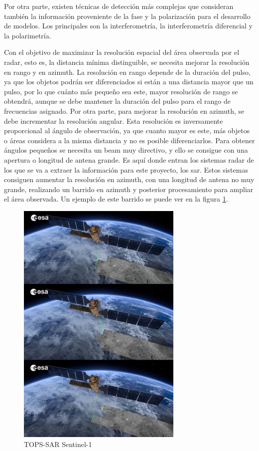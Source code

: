 \par Por otra parte, existen técnicas de detección más complejas que consideran también la información proveniente de la fase y la polarización para el desarrollo de modelos. Los principales son la interferometría, la interferometría diferencial y la polarimetría.
\\
\par Con el objetivo de maximizar la resolución espacial del área observada por el radar, esto es, la distancia mínima distinguible, se necesita mejorar la resolución en rango y en azimuth. La resolución en rango depende de la duración del pulso, ya que los objetos podrán ser diferenciados si están a una distancia mayor que un pulso, por lo que cuánto más pequeño sea este, mayor resolución de rango se obtendrá, aunque se debe mantener la duración del pulso para el rango de frecuencias asignado. Por otra parte, para mejorar la resolución en azimuth, se debe incrementar la resolución angular. Esta resolución es inversamente proporcional al ángulo de observación, ya que cuanto mayor es este, más objetos o áreas considera a la misma distancia y no es posible diferenciarlos. Para obtener ángulos pequeños se necesita un beam muy directivo, y ello se consigue con una apertura o longitud de antena grande. Es aquí donde entran los sistemas radar de los que se va a extraer la información para este proyecto, los \gls{sar}. Estos sistemas consiguen aumentar la resolución en azimuth, con una longitud de antena no muy grande, realizando un barrido en azimuth y posterior procesamiento para ampliar el área observada. Un ejemplo de este barrido se puede ver en la figura \ref{fig:sarb}.
\\
\begin{figure}[h]
    \centering
    \includegraphics[height=12cm]{archivos/tfg/imgbarrido} %
    \caption{TOPS-SAR Sentinel-1 \cite{yts1}}
    \label{fig:sarb}
\end{figure}

